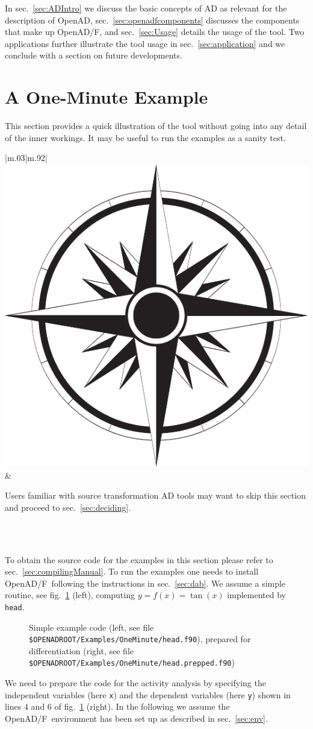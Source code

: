 \documentclass{book}
\newcommand{\OpenADF}{OpenAD/F}
\newcommand{\OpenAD}{OpenAD}
\newcommand{\refsec}[1]{{sec.~\ref{#1}}}
\newcommand{\reffig}[1]{{fig.~\ref{#1}}}
\newcommand{\nav}[1]{
\begin{tabular}{|m{.03\textwidth}|m{.92\textwidth}|}\hline
\vspace{1mm}
\includegraphics[width=.03\textwidth]{windrose_zh1}&
\vspace{1mm}
\begin{minipage}[c]{.86\textwidth}
\small {#1}
\end{minipage}
\vspace{1mm}
\\\hline
\end{tabular}
}
\begin{document}
In \refsec{sec:ADIntro} we discuss the basic concepts of AD as relevant for 
the description of \OpenAD, \refsec{sec:openadfcomponents} discusses the components 
that make up \OpenADF, and \refsec{sec:Usage} details the usage of the tool. 
Two applications further illustrate the tool usage in \refsec{sec:application} and 
we conclude with a section on future developments.

\section{A One-Minute Example} \label{sec:oneMinute}

This section provides a quick illustration of the tool without going into any detail of 
the inner workings. It may be useful to run the examples as a sanity test. \\
\nav{Users familiar with source transformation AD tools may want to skip this section and proceed  to \refsec{sec:deciding}.}\\
To obtain the source code for the examples in this section please refer to \refsec{sec:compilingManual}. 
To run the examples one needs to install \OpenADF\ following the instructions in \refsec{sec:dab}.
We assume a simple routine, see \reffig{fig:OneMinute} (left), computing $y=f(x)=\tan(x)$ implemented by \lstinline{head}.
\begin{figure}
\begin{minipage}[t]{.48\linewidth}

\end{minipage}
\hspace{.02\linewidth}
\begin{minipage}[t]{.48\linewidth}

\end{minipage}
\caption{Simple example code (left, see file 
\lstinline{$OPENADROOT/Examples/OneMinute/head.f90}), %
prepared for differentiation (right, see file 
\lstinline{$OPENADROOT/Examples/OneMinute/head.prepped.f90})}%
\label{fig:OneMinute}
\end{figure}
We need to prepare the code for the activity analysis by specifying the independent variables
(here \lstinline{x}) and the dependent variables 
(here \lstinline{y}) shown in lines 4 and 6 of \reffig{fig:OneMinute} (right).
In the following we assume the \OpenADF\ environment has been set up as 
described in \refsec{sec:env}.
\end{document}
